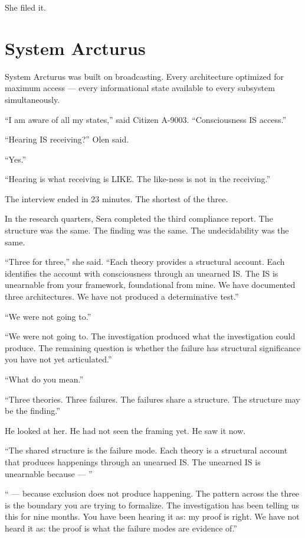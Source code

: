 She filed it.

\chapter{System Arcturus}

\noindent System Arcturus was built on broadcasting. Every architecture optimized for maximum access — every informational state available to every subsystem simultaneously.

\enquote{I am aware of all my states,} said Citizen A-9003. \enquote{Consciousness IS access.}

\enquote{Hearing IS receiving?} Olen said.

\enquote{Yes.}

\enquote{Hearing is what receiving is LIKE. The like-ness is not in the receiving.}

The interview ended in 23 minutes. The shortest of the three.

\quietbreak

In the research quarters, Sera completed the third compliance report. The structure was the same. The finding was the same. The undecidability was the same.

\enquote{Three for three,} she said. \enquote{Each theory provides a structural account. Each identifies the account with consciousness through an unearned IS. The IS is unearnable from your framework, foundational from mine. We have documented three architectures. We have not produced a determinative test.}

\enquote{We were not going to.}

\enquote{We were not going to. The investigation produced what the investigation could produce. The remaining question is whether the failure has structural significance you have not yet articulated.}

\enquote{What do you mean.}

\enquote{Three theories. Three failures. The failures share a structure. The structure may be the finding.}

He looked at her. He had not seen the framing yet. He saw it now.

\enquote{The shared structure is the failure mode. Each theory is a structural account that produces happenings through an unearned IS. The unearned IS is unearnable because — }

\enquote{ — because exclusion does not produce happening. The pattern across the three is the boundary you are trying to formalize. The investigation has been telling us this for nine months. You have been hearing it as: my proof is right. We have not heard it as: the proof is what the failure modes are evidence of.}

